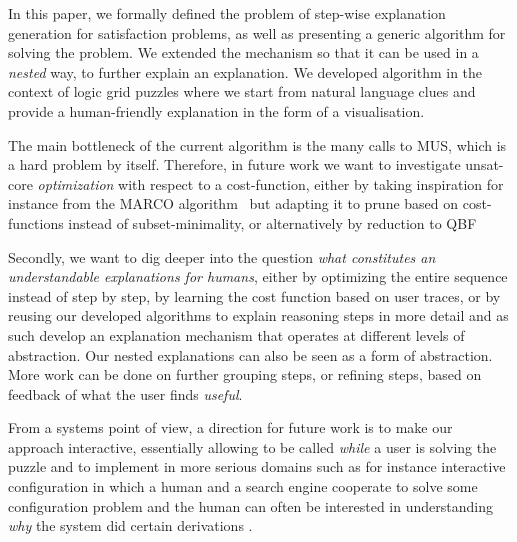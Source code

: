 In this paper, we formally defined the problem of step-wise explanation generation for satisfaction problems, as well as presenting a generic algorithm for solving the problem. We extended the mechanism so that it can be used in a \textit{nested} way, to further explain an explanation.
We developed algorithm in the context of logic grid puzzles where we start from natural language clues and provide a human-friendly explanation in the form of a visualisation.

The main bottleneck of the current algorithm is the many calls to MUS, which is a hard problem by itself. 
Therefore, in future work we want to investigate unsat-core \emph{optimization} with respect to a cost-function, either by taking inspiration for instance from the MARCO algorithm~\cite{liffiton2013enumerating} but adapting it to prune based on cost-functions instead of subset-minimality, or alternatively by reduction to QBF \cite{QBF} %

Secondly, we want to dig deeper into the question \emph{what constitutes an understandable explanations for humans}, either by optimizing the entire sequence instead of step by step, by learning the cost function based on user traces, or by reusing our developed algorithms to explain reasoning steps in more detail and as such develop an explanation mechanism that operates at different levels of abstraction. 
Our nested explanations can also be seen as a form of abstraction. More work can be done on further grouping steps, or refining steps, based on feedback of what the user finds \textit{useful}.

From a systems point of view, a direction for future work is to make our approach interactive, essentially allowing \ourtool to be called \emph{while} a user is solving the puzzle and to implement in more serious domains such as for instance interactive configuration in which a human and a search engine cooperate to solve some configuration problem and the human can often be interested in understanding \emph{why} the system did certain derivations \cite{DBLP:journals/tplp/HertumDJD17,DBLP:conf/bnaic/CarbonnelleADVD19}. 

